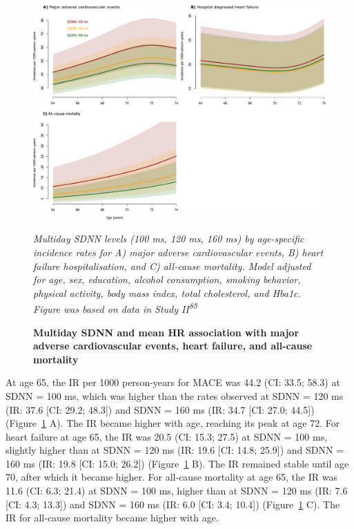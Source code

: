 \documentclass[
  letterpaper,
  headsepline=true,
  open=any]{scrbook}
\begin{document}
\begin{figure}

{\centering 

\includegraphics{images/addition_pro_hrv_ir_mace.pdf}

\emph{Multiday SDNN levels (100 ms, 120 ms, 160 ms) by age-specific
incidence rates for A) major adverse cardiovascular events, B) heart
failure hospitalisation, and C) all-cause mortality. Model adjusted for
age, sex, education, alcohol consumption, smoking behavior, physical
activity, body mass index, total cholesterol, and Hba1c. Figure was
based on data in Study II\textsuperscript{85}}

}

\caption{\label{fig-addprohrv}\textbf{Multiday SDNN and mean HR
association with major adverse cardiovascular events, heart failure, and
all-cause mortality}}

\end{figure}

\restoregeometry

At age 65, the IR per 1000 person-years for MACE was 44.2 (CI: 33.5;
58.3) at SDNN = 100 ms, which was higher than the rates observed at SDNN
= 120 ms (IR: 37.6 {[}CI: 29.2; 48.3{]}) and SDNN = 160 ms (IR: 34.7
{[}CI: 27.0; 44.5{]}) (Figure~\ref{fig-addprohrv} A). The IR became
higher with age, reaching its peak at age 72. For heart failure at age
65, the IR was 20.5 (CI: 15.3; 27.5) at SDNN = 100 ms, slightly higher
than at SDNN = 120 ms (IR: 19.6 {[}CI: 14.8; 25.9{]}) and SDNN = 160 ms
(IR: 19.8 {[}CI: 15.0; 26.2{]}) (Figure~\ref{fig-addprohrv} B). The IR
remained stable until age 70, after which it became higher. For
all-cause mortality at age 65, the IR was 11.6 (CI: 6.3; 21.4) at SDNN =
100 ms, higher than at SDNN = 120 ms (IR: 7.6 {[}CI: 4.3; 13.3{]}) and
SDNN = 160 ms (IR: 6.0 {[}CI: 3.4; 10.4{]}) (Figure~\ref{fig-addprohrv}
C). The IR for all-cause mortality became higher with age.
\end{document}
